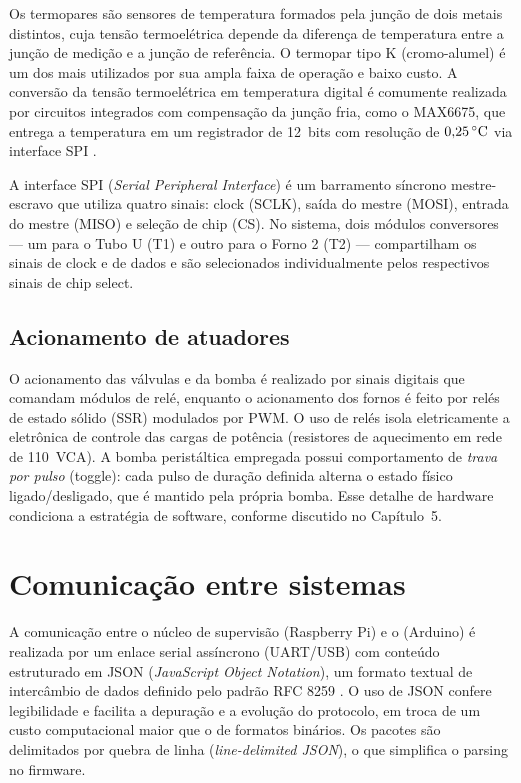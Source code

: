 Os termopares s\~ao sensores de temperatura formados pela jun\c{c}\~ao de dois
metais distintos, cuja tens\~ao termoel\'etrica depende da diferen\c{c}a de
temperatura entre a jun\c{c}\~ao de medi\c{c}\~ao e a jun\c{c}\~ao de
refer\^encia. O termopar tipo K (cromo-alumel) \'e um dos mais utilizados por
sua ampla faixa de opera\c{c}\~ao e baixo custo. A convers\~ao da tens\~ao
termoel\'etrica em temperatura digital \'e comumente realizada por circuitos
integrados com compensa\c{c}\~ao da jun\c{c}\~ao fria, como o MAX6675, que
entrega a temperatura em um registrador de 12~bits com resolu\c{c}\~ao de
$0{,}25\,\celsius$ via interface SPI \cite{max6675, nist_its90}.

A interface SPI (\emph{Serial Peripheral Interface}) \'e um barramento
s\'incrono mestre-escravo que utiliza quatro sinais: clock (SCLK), sa\'ida do
mestre (MOSI), entrada do mestre (MISO) e sele\c{c}\~ao de chip (CS). No
sistema, dois m\'odulos conversores --- um para o Tubo U (T1) e outro para o
Forno 2 (T2) --- compartilham os sinais de clock e de dados e s\~ao
selecionados individualmente pelos respectivos sinais de chip select.

\subsection{Acionamento de atuadores}

O acionamento das v\'alvulas e da bomba \'e realizado por sinais digitais que
comandam m\'odulos de rel\'e, enquanto o acionamento dos fornos \'e feito por
rel\'es de estado s\'olido (SSR) modulados por PWM. O uso de rel\'es isola
eletricamente a eletr\^onica de controle das cargas de pot\^encia (resistores de
aquecimento em rede de 110~VCA). A bomba perist\'altica empregada possui
comportamento de \emph{trava por pulso} (toggle): cada pulso de dura\c{c}\~ao
definida alterna o estado f\'isico ligado/desligado, que \'e mantido pela pr\'opria
bomba. Esse detalhe de hardware condiciona a estrat\'egia de software, conforme
discutido no Cap\'itulo~5.

\section{Comunica\c{c}\~ao entre sistemas}

A comunica\c{c}\~ao entre o n\'ucleo de supervis\~ao (Raspberry Pi) e o \daq
(Arduino) \'e realizada por um enlace serial ass\'incrono (UART/USB) com
conte\'udo estruturado em JSON (\emph{JavaScript Object Notation}), um formato
textual de interc\^ambio de dados definido pelo padr\~ao RFC 8259
\cite{bray2017}. O uso de JSON confere legibilidade e facilita a depura\c{c}\~ao
e a evolu\c{c}\~ao do protocolo, em troca de um custo computacional maior que o
de formatos bin\'arios. Os pacotes s\~ao delimitados por quebra de linha
(\emph{line-delimited JSON}), o que simplifica o parsing no firmware.

